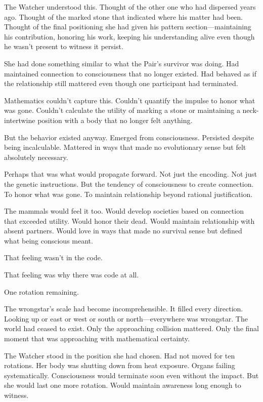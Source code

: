 The Watcher understood this. Thought of the other one who had dispersed years ago. Thought of the marked stone that indicated where his matter had been. Thought of the final positioning she had given his pattern section—maintaining his contribution, honoring his work, keeping his understanding alive even though he wasn't present to witness it persist.

She had done something similar to what the Pair's survivor was doing. Had maintained connection to consciousness that no longer existed. Had behaved as if the relationship still mattered even though one participant had terminated.

Mathematics couldn't capture this. Couldn't quantify the impulse to honor what was gone. Couldn't calculate the utility of marking a stone or maintaining a neck-intertwine position with a body that no longer felt anything.

But the behavior existed anyway. Emerged from consciousness. Persisted despite being incalculable. Mattered in ways that made no evolutionary sense but felt absolutely necessary.

Perhaps that was what would propagate forward. Not just the encoding. Not just the genetic instructions. But the tendency of consciousness to create connection. To honor what was gone. To maintain relationship beyond rational justification.

The mammals would feel it too. Would develop societies based on connection that exceeded utility. Would honor their dead. Would maintain relationship with absent partners. Would love in ways that made no survival sense but defined what being conscious meant.

That feeling wasn't in the code.

That feeling was why there was code at all.

\scenebreak

One rotation remaining.

The wrongstar's scale had become incomprehensible. It filled every direction. Looking up or east or west or south or north—everywhere was wrongstar. The world had ceased to exist. Only the approaching collision mattered. Only the final moment that was approaching with mathematical certainty.

The Watcher stood in the position she had chosen. Had not moved for ten rotations. Her body was shutting down from heat exposure. Organs failing systematically. Consciousness would terminate soon even without the impact. But she would last one more rotation. Would maintain awareness long enough to witness.

